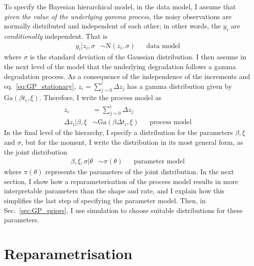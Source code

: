 To specify the Bayesian hierarchical model, in the data model, I assume that \emph{given the value of the underlying gamma process}, the noisy observations are normally distributed and independent of each other; in other words, the $y_i$ are \emph{conditionally} independent. That is
\begin{align*}
 y_i|z_i, \sigma & \sim \mbox{N}(z_i, \sigma)  && \mbox{data model}
\end{align*}
where $\sigma$ is the standard deviation of the Gaussian distribution. I then assume in the next level of the model that the underlying degradation follows a gamma degradation process. As a consequence of the independence of the increments and eq.~\eqref{eq:GP_stationary}, $z_i = \sum_{j = 0}^i \Delta z_j$ has a gamma distribution given by $\mbox{Ga}(\beta t_i, \xi)$. Therefore, I write the process model as
\begin{align*}
 z_i & = \sum_{j=0}^i \Delta z_j \\ 
 \Delta z_i | \beta, \xi & \sim \mbox{Ga}(\beta \Delta t_i, \xi) && \mbox{process model}
\end{align*}
In the final level of the hierarchy, I specify a distribution for the parameters $\beta, \xi$ and $\sigma$, but for the moment, I write the distribution in its most general form, as the joint distribution
\begin{align*}
 \beta, \xi, \sigma | \theta & \sim \pi(\theta) && \mbox{parameter model}
\end{align*}
where $\pi(\theta)$ represents the parameters of the joint distribution. In the next section, I show how a reparameterisation of the process model results in more interpretable parameters than the shape and rate, and I explain how this simplifies the last step of specifying the parameter model. Then, in Sec.~\ref{sec:GP_priors}, I use simulation to choose suitable distributions for these parameters.

\section{Reparametrisation} \label{sec:GP-reparameterisation}

